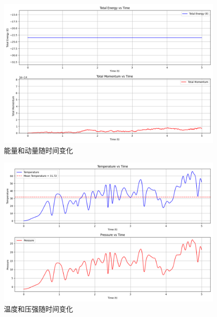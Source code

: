 \documentclass[11pt]{article}
\begin{document}

\maketitle %

\thispagestyle{empty} %

\newpage


\begin{question}

\begin{figure}[H]
  \centering
  \includegraphics[width=0.7\columnwidth]{1/a1.png}
  \caption{能量和动量随时间变化}
\end{figure}
\begin{figure}[H]
  \centering
  \includegraphics[width=0.7\columnwidth]{1/a2.png}
  \caption{温度和压强随时间变化}
\end{figure}


\end{question}
\end{document}
